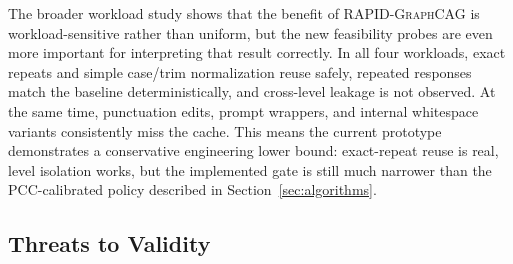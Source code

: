 \documentclass[11pt,a4paper,twocolumn]{article}
\newcommand{\rapid}{\textsc{RAPID-GraphCAG}}
\begin{document}
\begin{table}[h]
\centering
\caption{Practical feasibility checks from the cache-selectivity probes (8 probe pairs per condition).}
\label{tab:feasibility}
{\scriptsize
\setlength{\tabcolsep}{3pt}
}
\end{table}

The broader workload study shows that the benefit of \rapid{} is workload-sensitive rather than uniform, but the new feasibility probes are even more important for interpreting that result correctly. In all four workloads, exact repeats and simple case/trim normalization reuse safely, repeated responses match the baseline deterministically, and cross-level leakage is not observed. At the same time, punctuation edits, prompt wrappers, and internal whitespace variants consistently miss the cache. This means the current prototype demonstrates a conservative engineering lower bound: exact-repeat reuse is real, level isolation works, but the implemented gate is still much narrower than the PCC-calibrated policy described in Section~\ref{sec:algorithms}.

\subsection{Threats to Validity}
\end{document}
